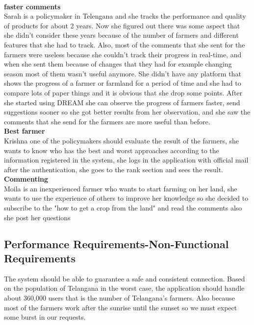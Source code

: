 \newline
\\
\textbf{faster comments}\\
Sarah is a policymaker in Telengana and she tracks the performance and quality of products for about 2 years. Now she figured out there was some aspect that she didn’t consider these years because of the number of farmers and different features that she had to track. Also, most of the comments that she sent for the farmers were useless because she couldn’t track their progress in real-time, and when she sent them because of changes that they had for example changing season most of them wasn’t useful anymore. She didn’t have any platform that shows the progress of a farmer or farmland for a period of time and she had to compare lots of paper things and it is obvious that she drop some points. After she started using DREAM she can observe the progress of farmers faster, send suggestions sooner so she got better results from her observation, and she saw the comments that she send for the farmers are more useful than before.
\newline
\\
\textbf{Best farmer}\\
Krishna one of the policymakers should evaluate the result of the farmers, she wants to know who has the best and worst approaches according to the information registered in the system, she logs in the application with official mail after the authentication, she goes to the rank section and sees the result.
\newline
\\
\textbf{Commenting}\\
Moila is an inexperienced farmer who wants to start farming on her land, she wants to use the experience of others to improve her knowledge so she decided to subscribe to the "how to get a crop from the land" and read the comments also she post her questions 

\newline
\subsection{Performance Requirements-Non-Functional Requirements}
The system should be able to guarantee a safe and consistent connection. Based on the population of Telangana in the worst case, the application should handle about 360,000 users that is the number of Telangana’s farmers. Also because most of the farmers work after the sunrise until the sunset so we must expect some burst in our requests. 
